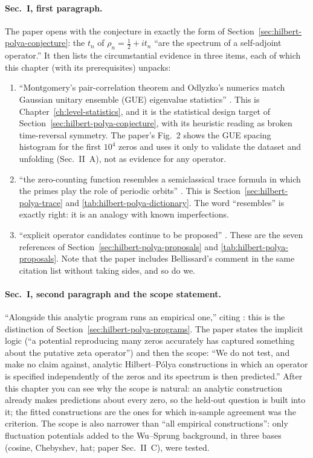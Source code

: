 \paragraph{Sec.~I, first paragraph.} The paper opens with the conjecture in exactly the form of Section~\ref{sec:hilbert-polya-conjecture}: the $t_n$ of $\rho_n=\tfrac12+it_n$ ``are the spectrum of a self-adjoint operator.'' It then lists the circumstantial evidence in three items, each of which this chapter (with its prerequisites) unpacks:
\begin{enumerate}
\item ``Montgomery's pair-correlation theorem and Odlyzko's numerics match Gaussian unitary ensemble (GUE) eigenvalue statistics'' \cite{montgomery,odlyzko87}. This is Chapter~\ref{ch:level-statistics}, and it is the statistical design target of Section~\ref{sec:hilbert-polya-conjecture}, with its heuristic reading as broken time-reversal symmetry. The paper's Fig.~2 shows the GUE spacing histogram for the first $10^4$ zeros and uses it only to validate the dataset and unfolding (Sec.~II~A), not as evidence for any operator.
\item ``the zero-counting function resembles a semiclassical trace formula in which the primes play the role of periodic orbits'' \cite{berrykeating99,schumayer}. This is Section~\ref{sec:hilbert-polya-trace} and \cref{tab:hilbert-polya-dictionary}. The word ``resembles'' is exactly right: it is an analogy with known imperfections.
\item ``explicit operator candidates continue to be proposed'' \cite{connes,bbm,bellissard,sierra,recenthp1,recenthp2,zetatriples}. These are the seven references of Section~\ref{sec:hilbert-polya-proposals} and \cref{tab:hilbert-polya-proposals}. Note that the paper includes Bellissard's comment in the same citation list without taking sides, and so do we.
\end{enumerate}

\paragraph{Sec.~I, second paragraph and the scope statement.} ``Alongside this analytic program runs an empirical one,'' citing \cite{wusprung,vanzyl,slater,jaksch}: this is the distinction of Section~\ref{sec:hilbert-polya-programs}. The paper states the implicit logic (``a potential reproducing many zeros accurately has captured something about the putative zeta operator'') and then the scope: ``We do not test, and make no claim against, analytic Hilbert--P\'olya constructions in which an operator is specified independently of the zeros and its spectrum is then predicted.'' After this chapter you can see why the scope is natural: an analytic construction already makes predictions about every zero, so the held-out question is built into it; the fitted constructions are the ones for which in-sample agreement was the criterion. The scope is also narrower than ``all empirical constructions'': only fluctuation potentials added to the Wu--Sprung background, in three bases (cosine, Chebyshev, hat; paper Sec.~II~C), were tested.

